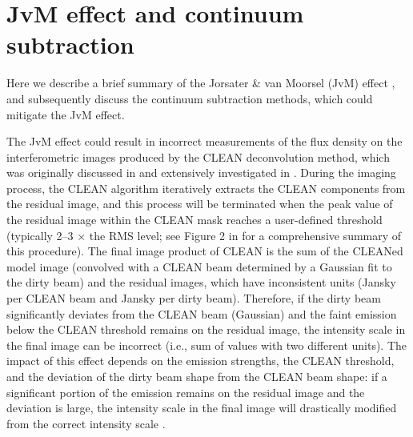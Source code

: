 \documentclass[twocolumn, twocolappendix, astrosymb, times]{aastex631}
\newcommand{\acetaldehyde}{CH$_3$CHO\xspace}
\newcommand{\methylformate}{CH$_3$OCHO\xspace}
\begin{document}
\begin{figure*}
\caption{Same as Figure \ref{fig:channelmap_CH3OH}, but for \acetaldehyde $5_{2,3}$ -- $4_{2,2}$ E $v_t=0$ transition.}
\label{fig:channelmap_CH3CHO}
\end{figure*}

\begin{figure*}
\caption{Same as Figure \ref{fig:channelmap_CH3OH}, but for \methylformate $8_{5,3}$ -- $7_{5,2}$ A $v_t=0$ transition.}
\label{fig:channelmap_CH3OCHO}
\end{figure*}



\section{JvM effect and continuum subtraction}\label{appendix:JvM_effect}
Here we describe a brief summary of the Jorsater \& van Moorsel (JvM) effect \citep{JvM, Czekala2021}, and subsequently discuss the continuum subtraction methods, which could mitigate the JvM effect.

The JvM effect could result in incorrect measurements of the flux density on the interferometric images produced by the CLEAN deconvolution method, which was originally discussed in \citet{JvM} and extensively investigated in \citet{Czekala2021}. During the imaging process, the CLEAN algorithm iteratively extracts the CLEAN components from the residual image, and this process will be terminated when the peak value of the residual image within the CLEAN mask reaches a user-defined threshold (typically 2--3 $\times$ the RMS level; see Figure 2 in \citet{Czekala2021} for a comprehensive summary of this procedure). The final image product of CLEAN is the sum of the CLEANed model image (convolved with a CLEAN beam determined by a Gaussian fit to the dirty beam) and the residual images, which have inconsistent units (Jansky per CLEAN beam and Jansky per dirty beam). Therefore, if the dirty beam significantly deviates from the CLEAN beam (Gaussian) and the faint emission below the CLEAN threshold remains on the residual image, the intensity scale in the final image can be incorrect (i.e., sum of values with two different units). The impact of this effect depends on the emission strengths, the CLEAN threshold, and the deviation of the dirty beam shape from the CLEAN beam shape: if a significant portion of the emission remains on the residual image and the deviation is large, the intensity scale in the final image will drastically modified from the correct intensity scale \citep{JvM, Czekala2021}.  
\end{document}
